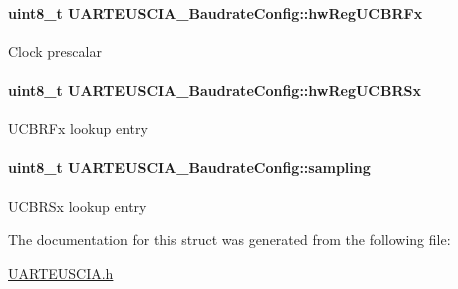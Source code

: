 \paragraph[{hw\-Reg\-U\-C\-B\-R\-Fx}]{\setlength{\rightskip}{0pt plus 5cm}uint8\-\_\-t U\-A\-R\-T\-E\-U\-S\-C\-I\-A\-\_\-\-Baudrate\-Config\-::hw\-Reg\-U\-C\-B\-R\-Fx}\label{struct_u_a_r_t_e_u_s_c_i_a___baudrate_config_a486441ac0287eee5d2f1cec429ca7a84}
Clock prescalar 
\paragraph[{hw\-Reg\-U\-C\-B\-R\-Sx}]{\setlength{\rightskip}{0pt plus 5cm}uint8\-\_\-t U\-A\-R\-T\-E\-U\-S\-C\-I\-A\-\_\-\-Baudrate\-Config\-::hw\-Reg\-U\-C\-B\-R\-Sx}\label{struct_u_a_r_t_e_u_s_c_i_a___baudrate_config_a644a24cfb8503deef280eb7142e98cbf}
U\-C\-B\-R\-Fx lookup entry 
\paragraph[{sampling}]{\setlength{\rightskip}{0pt plus 5cm}uint8\-\_\-t U\-A\-R\-T\-E\-U\-S\-C\-I\-A\-\_\-\-Baudrate\-Config\-::sampling}\label{struct_u_a_r_t_e_u_s_c_i_a___baudrate_config_a9c18d479e91a0b5258fcd1821c09cf2e}
U\-C\-B\-R\-Sx lookup entry 

The documentation for this struct was generated from the following file\-:\begin{DoxyCompactItemize}
\item 
\hyperlink{_u_a_r_t_e_u_s_c_i_a_8h}{U\-A\-R\-T\-E\-U\-S\-C\-I\-A.\-h}\end{DoxyCompactItemize}
